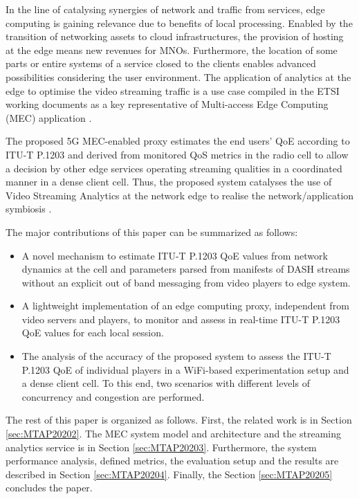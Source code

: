 In the line of catalysing synergies of network and traffic from services, edge computing is gaining relevance due to benefits of local processing. Enabled by the transition of networking assets to cloud infrastructures, the provision of hosting at the edge means new revenues for MNOs. Furthermore, the location of some parts or entire systems of a service closed to the clients enables advanced possibilities considering the user environment. The application of analytics at the edge to optimise the video streaming traffic is a use case compiled in the ETSI working documents as a key representative of Multi-access Edge Computing (MEC) application \cite{etsigsmec002}.

The proposed 5G MEC-enabled proxy estimates the end users' QoE according to ITU-T P.1203 \cite{itup1203} and derived from monitored QoS metrics in the radio cell to allow a decision by other edge services operating streaming qualities in a coordinated manner in a dense client cell. Thus, the proposed system catalyses the use of Video Streaming Analytics at the network edge to realise the network/application symbiosis \cite{etsigsmec002}.

The major contributions of this paper can be summarized as follows:
\begin{itemize}
	\item A novel mechanism to estimate ITU-T P.1203 \cite{itup1203} QoE values from network dynamics at the cell and parameters parsed from manifests of DASH streams without an explicit out of band messaging from video players to edge system.
	\item A lightweight implementation of an edge computing proxy, independent from video servers and players, to monitor and assess in real-time ITU-T P.1203 QoE values for each local session.
	\item The analysis of the accuracy of the proposed system to assess the ITU-T P.1203 QoE of individual players in a WiFi-based experimentation setup and a dense client cell. To this end, two scenarios with different levels of concurrency and congestion are performed.
\end{itemize}

The rest of this paper is organized as follows. First, the related work is in Section \ref{sec:MTAP20202}. The MEC system model and architecture and the streaming analytics service is in Section \ref{sec:MTAP20203}.
Furthermore, the system performance analysis, defined metrics, the evaluation setup and the results are described in Section \ref{sec:MTAP20204}. Finally, the Section \ref{sec:MTAP20205} concludes the paper.

